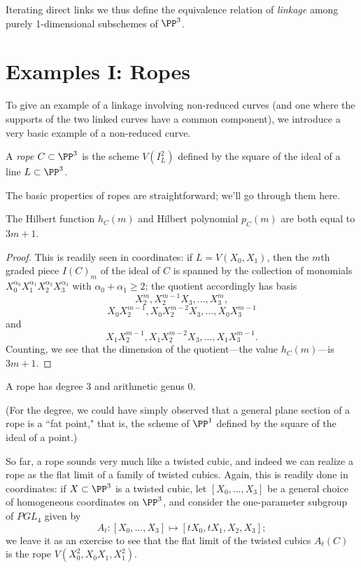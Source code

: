 Iterating direct links we thus define the equivalence relation of \emph{linkage} among purely 1-dimensional subschemes
of $\PP^3$.

\section{Examples I: Ropes}

To give an example of a linkage involving non-reduced curves (and one where the supports of the two linked curves have a common component), we introduce a very basic example of a non-reduced curve.

\begin{definition}
A \emph{rope} $C \subset \PP^3$ is the scheme $V(I^2_L)$ defined by the square of the ideal of a line $L \subset \PP^3$.
\end{definition}

The basic properties of ropes are straightforward; we'll go through them here. 

\begin{proposition}
The Hilbert function $h_C(m)$ and Hilbert polynomial $p_C(m)$ are both equal to $3m+1$.
\end{proposition}

\begin{proof}
This is readily seen in coordinates: if $L=V(X_0, X_1)$, then the $m$th graded piece $I(C)_m$ of the ideal of $C$ is spanned by the collection of monomials $X_0^{\alpha_0}X_1^{\alpha_1}X_2^{\alpha_2}X_3^{\alpha_3}$ with $\alpha_0 + \alpha_1 \geq 2$; the quotient accordingly has basis
$$
X_2^m, X_2^{m-1}X_3,\dots, X_3^m, 
$$
$$
X_0X_2^{m-1}, X_0X_2^{m-2}X_3, \dots, X_0X_3^{m-1}
$$
and 
$$
X_1X_2^{m-1}, X_1X_2^{m-2}X_3, \dots, X_1X_3^{m-1}.
$$
Counting, we see that the dimension of the quotient---the value $h_C(m)$---is $3m+1$.
\end{proof}

\begin{corollary}
A rope has degree 3 and arithmetic genus 0.
\end{corollary}

(For the degree, we could have simply observed that a general plane section of a rope is a ``fat point," that is, the scheme of $\PP^1$ defined by the square of the ideal of a point.)

So far, a rope sounds very much like a twisted cubic, and indeed we can realize a rope as the flat limit of a family of twisted cubics. Again, this is readily done in coordinates: if $X \subset \PP^3$ is a twisted cubic, let $[X_0,\dots,X_3]$ be a general choice of homogeneous coordinates on $\PP^3$, and consider the one-parameter subgroup of $PGL_4$ given by
$$
A_t : [X_0,\dots,X_3] \mapsto [tX_0, tX_1, X_2,X_3];
$$
we leave it as an exercise to see that the flat limit of the twisted cubics $A_t(C)$ is the rope $V(X_0^2, X_0X_1,X_1^2)$.

